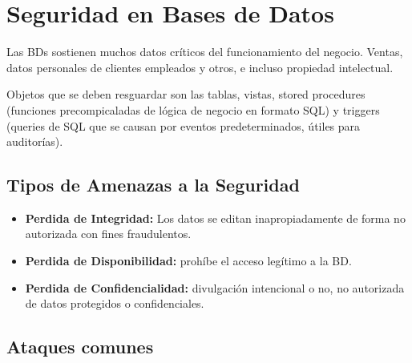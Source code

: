 \section*{Seguridad en Bases de Datos}

Las BDs sostienen muchos datos críticos del funcionamiento del negocio. Ventas, datos personales de clientes empleados y otros, e incluso propiedad intelectual.

Objetos que  se  deben resguardar  son las tablas, vistas, stored procedures (funciones precompicaladas de lógica de negocio en formato  SQL) y triggers (queries de SQL que se causan por eventos predeterminados, útiles  para auditorías).

\subsection*{Tipos de Amenazas a la Seguridad}

\begin{itemize}
    \item \textbf{Perdida de Integridad:} Los datos se editan inapropiadamente de  forma no autorizada con fines fraudulentos.
    \item \textbf{Perdida  de Disponibilidad:} prohíbe el acceso legítimo a la BD.
    \item \textbf{Perdida de Confidencialidad:} divulgación intencional o no, no autorizada de datos protegidos o confidenciales.
\end{itemize}

\subsection*{Ataques comunes}

